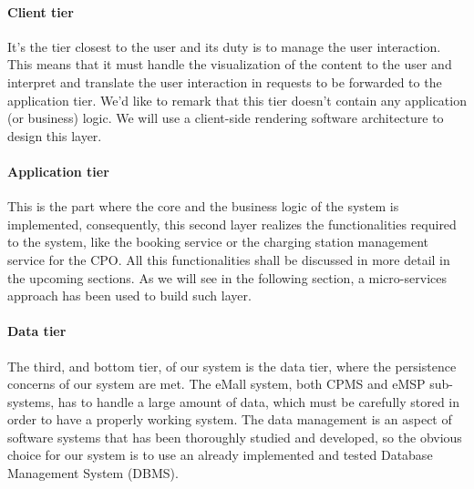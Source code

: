 \paragraph{Client tier} It's the tier closest to the user and its duty is to manage the user interaction. This means that it must handle the visualization of the content to the user and interpret and translate the user interaction in requests to be forwarded to the application tier. We'd like to remark that this tier doesn't contain any application (or business) logic. We will use a client-side rendering software architecture to design this layer.

\paragraph{Application tier} This is the part where the core and the business logic of the system is implemented, consequently, this second layer realizes the functionalities required to the system, like the booking service or the charging station management service for the CPO. All this functionalities shall be discussed in more detail in the upcoming sections. As we will see in the following section, a micro-services approach has been used to build such layer.

\paragraph{Data tier} The third, and bottom tier, of our system is the data tier, where the persistence concerns of our system are met. The eMall system, both CPMS and eMSP sub-systems, has to handle a large amount of data, which must be carefully stored in order to have a properly working system. The data management is an aspect of software systems that has been thoroughly studied and developed, so the obvious choice for our system is to use an already implemented and tested Database Management System (DBMS).

